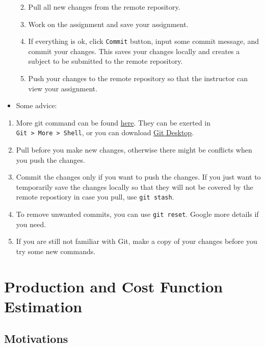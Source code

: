 \documentclass[
]{book}
\providecommand{\tightlist}{%
  \setlength{\itemsep}{0pt}\setlength{\parskip}{0pt}}
\begin{document}
\begin{itemize}
  \begin{enumerate}
  \def\labelenumi{\arabic{enumi}.}
  \tightlist
  \item
    Pull all new changes from the remote repository.
  \item
    Work on the assignment and save your assignment.
  \item
    If everything is ok, click \texttt{Commit} button, input some commit message, and commit your changes. This saves your changes locally and creates a subject to be submitted to the remote repository.
  \item
    Push your changes to the remote repository so that the instructor can view your assignment.
  \end{enumerate}
\item
  Some advice:
\end{itemize}

\begin{enumerate}
\def\labelenumi{\arabic{enumi}.}
\tightlist
\item
  More git command can be found \href{https://docs.github.com/en/github/using-git}{here}. They can be exerted in \texttt{Git\ \textgreater{}\ More\ \textgreater{}\ Shell}, or you can download \href{https://git-scm.com/download/win}{Git Desktop}.
\item
  Pull before you make new changes, otherwise there might be conflicts when you push the changes.\\
\item
  Commit the changes only if you want to push the changes. If you just want to temporarily save the changes locally so that they will not be covered by the remote repostiory in case you pull, use \texttt{git\ stash}.
\item
  To remove unwanted commits, you can use \texttt{git\ reset}. Google more details if you need.
\item
  If you are still not familiar with Git, make a copy of your changes before you try some new commands.
\end{enumerate}

\hypertarget{production}{%
\chapter{Production and Cost Function Estimation}\label{production}}

\hypertarget{motivations}{%
\section{Motivations}\label{motivations}}
\end{document}
